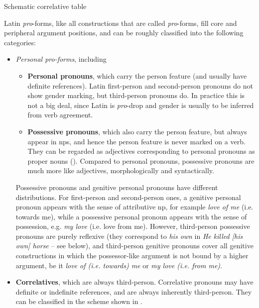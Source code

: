 \documentclass{article}
\newcommand*{\concept}[1]{\textbf{#1}}
\newcommand*{\term}[1]{\emph{#1}}
\newcommand*{\corpus}[1]{\emph{#1}}
\begin{document}
\begin{table}
    \caption{Schematic correlative table}
    \label{tbl:pro-form-scheme}
    \centering
    
\end{table}

Latin \term{pro}-forms, like all constructions that are called \term{pro}-forms, 
fill core and peripheral argument positions, 
and can be roughly classified into the following categories:
\begin{itemize}
    \item \emph{Personal \term{pro}-forms}, including
    \begin{itemize}
        \item \concept{Personal pronouns}, which carry the person feature (and usually have definite references).
        Latin first-person and second-person pronouns do not show gender marking,
        but third-person pronouns do.
        In practice this is not a big deal,
        since Latin is \term{pro}-drop and 
        gender is usually to be inferred from verb agreement.
        \item \concept{Possessive pronouns}, which also carry the person feature,
        but always appear in \ac{np}s,
        and hence the person feature is never marked on a verb.
        They can be regarded as adjectives corresponding to personal pronouns as proper nouns 
        ().
        Compared to personal pronouns, 
        possessive pronouns are much more like adjectives, morphologically and syntactically. %
    \end{itemize}

    Possessive pronouns and genitive personal pronouns have different distributions.
    For first-person and second-person ones,
    a genitive personal pronoun appears with the sense of attributive \ac{np}, for example
    \corpus{love of me} (i.e. towards me),
    while a possessive personal pronoun appears with the sense of possession,
    e.g. \corpus{my love} (i.e. love from me).
    However, third-person possessive pronouns are purely reflexive 
    (they correspond to \corpus{his own} in \corpus{He killed [his own] horse} -- see below),
    and third-person genitive pronouns cover all genitive constructions 
    in which the possessor-like argument is not bound by a higher argument,
    be it \corpus{love of (i.e. towards) me} or \corpus{my love (i.e. from me)}.

    \item \concept{Correlatives}, which are always third-person. 
    Correlative pronouns may have definite or indefinite references,
    and are always inherently third-person.
    They can be classified in the scheme shown in .


\end{itemize}
\end{document}
